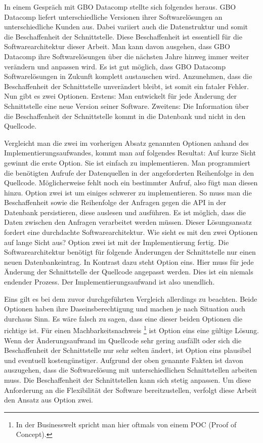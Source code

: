 In einem Gespräch mit GBO Datacomp stellte sich folgendes heraus. GBO Datacomp liefert unterschiedliche Versionen ihrer
Softwarelösungen an unterschiedliche Kunden aus. Dabei variiert auch die Datenstruktur und somit die Beschaffenheit der
Schnittstelle. Diese Beschaffenheit ist essentiell für die Softwarearchitektur dieser Arbeit. Man kann davon ausgehen,
dass GBO Datacomp ihre Softwarelösungen über die nächsten Jahre hinweg immer weiter verändern und anpassen wird.
Es ist gut möglich, dass GBO Datacomp Softwarelösungen in Zukunft komplett austauschen wird. Anzunehmen,
dass die Beschaffenheit der Schnittstelle unverändert bleibt, ist somit ein fataler Fehler. Nun gibt es zwei Optionen.
Erstens: Man entwickelt für jede Änderung der Schnittstelle eine neue Version seiner Software. Zweitens:
Die Information über die Beschaffenheit der Schnittstelle kommt in die Datenbank und nicht in den
Quellcode.

Vergleicht man die zwei im vorherigen Absatz genannten Optionen anhand des Implementierungsaufwandes,
kommt man auf folgendes Resultat: Auf kurze Sicht gewinnt die erste Option. Sie ist einfach zu implementieren.
Man programmiert die benötigten Aufrufe der Datenquellen in der angeforderten Reihenfolge in den Quellcode.
Möglicherweise fehlt noch ein bestimmter Aufruf, also fügt man diesen hinzu.
Option zwei ist um einiges schwerer zu implementieren. So muss man die Beschaffenheit sowie die Reihenfolge der Anfragen
gegen die API in der Datenbank persistieren, diese auslesen und ausführen. Es ist möglich, dass die Daten zwischen den
Anfragen verarbeitet werden müssen. Dieser Lösungsansatz fordert eine durchdachte Softwarearchitektur. Wie sieht es mit den
zwei Optionen auf lange Sicht aus? Option zwei ist mit der Implementierung fertig. Die Softwarearchitektur
benötigt für folgende Änderungen der Schnittstelle nur einen neuen Datenbankeintrag. In Kontrast dazu steht Option eins.
Hier muss für jede Änderung der Schnittstelle der Quellcode angepasst werden. Dies ist ein niemals endender Prozess.
Der Implementierungsaufwand ist also unendlich.

Eins gilt es bei dem zuvor durchgeführten Vergleich allerdings zu beachten. Beide Optionen haben ihre Daseinsberechtigung
und machen je nach Situation auch durchaus Sinn. Es wäre falsch zu sagen, dass eine dieser beiden Optionen die richtige ist. Für einen
Machbarkeitsnachweis \footnote{In der Businesswelt spricht man hier oftmals von einem POC (Proof of Concept).}
ist Option eins eine gültige Lösung. Wenn der Änderungsaufwand im Quellcode sehr gering ausfällt oder sich
die Beschaffenheit der Schnittstelle nur sehr selten ändert, ist Option eins plausibel und eventuell kostengünstiger.
Aufgrund der oben genannte Fakten ist davon auszugehen, dass die Softwarelösung mit unterschiedlichen Schnittstellen arbeiten muss.
Die Beschaffenheit der Schnittstellen kann sich stetig anpassen. Um diese Anforderung an die Flexibilität
der Software bereitzustellen, verfolgt diese Arbeit den Ansatz aus Option zwei.

